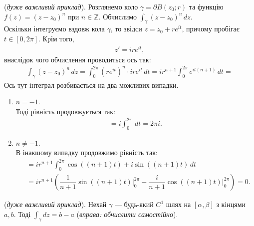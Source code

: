 \documentclass{math_library}
\begin{document}
\begin{example}
\label{integral_of_1_over_z}
(\textit{дуже важливий приклад}). Розглянемо коло $\gamma = \partial B(z_0;r)$ та функцію $f(z) = (z-z_0)^n$ при $n \in \mathbb{Z}$. Обчислимо $\displaystyle\int_\gamma (z-z_0)^n\,dz$.
\bigskip \\
Оскільки інтегруємо вздовж кола $\gamma$, то звідси $z = z_0 + r e^{i t}$, причому пробігає $t \in [0,2\pi]$. Крім того,
\begin{align*}
z' = i r e^{it},
\end{align*}
внаслідок чого обчислення проводиться ось так:
\begin{align*}
\int_\gamma (z-z_0)^n\,dz = \int_0^{2\pi} (r e^{it })^n \cdot i re^{it}\,dt = i r^{n+1} \int_0^{2\pi} e^{it (n+1)}\,dt \boxed{=}
\end{align*}
Ось тут інтеграл розбивається на два можливих випадки.
\begin{enumerate}[wide=0pt,label={\Roman*.}]
\item $n = -1$.\\
Тоді рівність продовжується так:
\begin{align*}
\boxed{=} i \int_0^{2\pi} \,dt = 2 \pi i.
\end{align*}
\item $n \neq -1$.\\
В інакшому випадку продовжимо рівність так:
\begin{align*}
& \boxed{=} ir^{n+1} \int_0^{2\pi} \cos ((n+1)t) + i \sin ((n+1)t)\,dt \\
& = ir^{n+1} \left( \dfrac{1}{n+1} \sin ((n+1)t) \Big|_{0}^{2\pi} - \dfrac{i}{n+1} \cos ((n+1)t) \Big|_{0}^{2\pi} \right) = 0.
\end{align*}
\end{enumerate}
\end{example}

\begin{example}
(\textit{дуже важливий приклад}). Нехай $\gamma$ --- будь-який $C^1$ шлях на $[\alpha,\beta]$ з кінцями $a,b$. Тоді $\displaystyle\int_\gamma dz = b-a$ (\textit{вправа: обчислити самостійно}).
\end{example}

\end{document}
